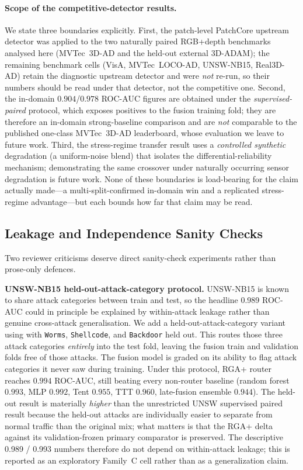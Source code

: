 \documentclass[10pt,conference]{IEEEtran}
\newcommand{\methodplus}{RGA+}
\begin{document}
\paragraph{Scope of the competitive-detector results.} We state three
boundaries explicitly. First, the patch-level PatchCore upstream
detector was applied to the two naturally paired RGB+depth benchmarks
analysed here (MVTec~3D-AD and the held-out external 3D-ADAM); the
remaining benchmark cells (VisA, MVTec~LOCO-AD, UNSW-NB15, Real3D-AD)
retain the diagnostic upstream detector and were \emph{not} re-run, so
their numbers should be read under that detector, not the competitive
one. Second, the in-domain $0.904$/$0.978$ ROC-AUC figures are obtained
under the \emph{supervised-paired} protocol, which exposes positives to
the fusion training fold; they are therefore an in-domain
strong-baseline comparison and are \emph{not} comparable to the
published one-class MVTec~3D-AD leaderboard, whose evaluation we leave to
future work. Third, the stress-regime transfer result uses a
\emph{controlled synthetic} degradation (a uniform-noise blend) that
isolates the differential-reliability mechanism; demonstrating the same
crossover under naturally occurring sensor degradation is future work.
None of these boundaries is load-bearing for the claim actually made---a
multi-split-confirmed in-domain win and a replicated stress-regime
advantage---but each bounds how far that claim may be read.

\subsection{Leakage and Independence Sanity Checks}
\label{sec:leakage-checks}

Two reviewer criticisms deserve direct sanity-check experiments rather
than prose-only defences.

\noindent\textbf{UNSW-NB15 held-out-attack-category protocol.}
UNSW-NB15 is known to share attack categories between train and test,
so the headline 0.989 ROC-AUC could in principle be explained by
within-attack leakage rather than genuine cross-attack generalisation.
We add a held-out-attack-category variant using
 with
\texttt{Worms}, \texttt{Shellcode}, and \texttt{Backdoor} held out. This routes
those three attack categories
\emph{entirely} into the test fold, leaving the fusion train and
validation folds free of those attacks. The fusion model is graded
on its ability to flag attack categories it never saw during
training. Under this protocol, \methodplus{} router reaches
$0.994$ ROC-AUC, still beating every non-router baseline
(random forest $0.993$, MLP $0.992$, Tent $0.955$, TTT $0.960$,
late-fusion ensemble $0.944$). The held-out result is materially
\emph{higher} than the unrestricted UNSW supervised paired result
because the held-out attacks are individually easier to separate from
normal traffic than the original mix; what matters is that the
\methodplus{} delta against its validation-frozen primary comparator
is preserved. The descriptive 0.989 / 0.993 numbers therefore do not
depend on within-attack leakage; this is reported as an exploratory
Family~C cell rather than as a generalization claim.
\end{document}
